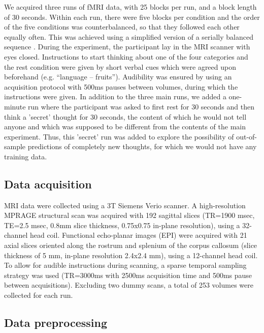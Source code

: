\documentclass[fleqn,10pt]{SelfArx} %
\begin{document}
We acquired three runs of fMRI data, with 25 blocks per run, and a block length of 30 seconds. Within each run, there were five blocks per condition and the order of the five conditions was counterbalanced, so that they followed each other equally often. This was achieved using a simplified version of a serially balanced sequence \citep{Nair_1967}. During the experiment, the participant lay in the MRI scanner with eyes closed. Instructions to start thinking about one of the four categories and the rest condition were given by short verbal cues which were agreed upon beforehand (e.g. “language – fruits”). Audibility was ensured by using an acquisition protocol with 500ms pauses between volumes, during which the instructions were given.
In addition to the three main runs, we added a one-minute run where the participant was asked to first rest for 30 seconds and then think a 'secret' thought for 30 seconds, the content of which he would not tell anyone and which was supposed to be different from the contents of the main experiment. Thus, this 'secret' run was added to explore the possibility of out-of-sample predictions of completely new thoughts, for which we would not have any training data.

\subsection{Data acquisition}

MRI data were collected using a 3T Siemens Verio scanner. A high-resolution MPRAGE structural scan was acquired with 192 sagittal slices (TR=1900 msec, TE=2.5 msec, 0.8mm slice thickness, 0.75x0.75 in-plane resolution), using a 32-channel head coil. Functional echo-planar images (EPI) were acquired with 21 axial slices oriented along the rostrum and splenium of the corpus callosum (slice thickness of 5 mm, in-plane resolution 2.4x2.4 mm), using a 12-channel head coil. To allow for audible instructions during scanning, a sparse temporal sampling strategy was used (TR=3000ms with 2500ms acquisition time and 500ms pause between acquisitions). Excluding two dummy scans, a total of 253 volumes were collected for each run.

\subsection{Data preprocessing}
\end{document}
